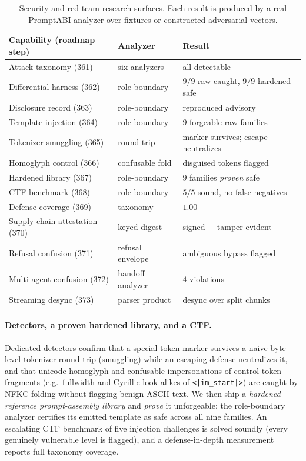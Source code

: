 \documentclass[10pt]{article}
\begin{document}
\begin{table}[t]
\centering
\small
\begin{tabular}{lll}
\toprule
Capability (roadmap step) & Analyzer & Result \\
\midrule
Attack taxonomy (361) & six analyzers & all detectable \\
Differential harness (362) & role-boundary & $9/9$ raw caught, $9/9$ hardened safe \\
Disclosure record (363) & role-boundary & reproduced advisory \\
Template injection (364) & role-boundary & $9$ forgeable raw families \\
Tokenizer smuggling (365) & round-trip & marker survives; escape neutralizes \\
Homoglyph control (366) & confusable fold & disguised tokens flagged \\
Hardened library (367) & role-boundary & $9$ families \emph{proven} safe \\
CTF benchmark (368) & role-boundary & $5/5$ sound, no false negatives \\
Defense coverage (369) & taxonomy & $1.00$ \\
Supply-chain attestation (370) & keyed digest & signed + tamper-evident \\
Refusal confusion (371) & refusal envelope & ambiguous bypass flagged \\
Multi-agent confusion (372) & handoff analyzer & $4$ violations \\
Streaming desync (373) & parser product & desync over split chunks \\
\bottomrule
\end{tabular}
\caption{Security and red-team research surfaces. Each result is produced by a
real PromptABI analyzer over fixtures or constructed adversarial vectors.}
\label{tab:redteam}
\end{table}

\paragraph{Detectors, a proven hardened library, and a CTF.}
Dedicated detectors confirm that a special-token marker survives a naive
byte-level tokenizer round trip (smuggling) while an escaping defense neutralizes
it, and that unicode-homoglyph and confusable impersonations of control-token
fragments (e.g.\ fullwidth and Cyrillic look-alikes of \texttt{<|im\_start|>})
are caught by NFKC-folding without flagging benign ASCII text. We then ship a
\emph{hardened reference prompt-assembly library} and \emph{prove} it
unforgeable: the role-boundary analyzer certifies its emitted template as safe
across all nine families. An escalating CTF benchmark of five injection
challenges is solved soundly (every genuinely vulnerable level is flagged), and a
defense-in-depth measurement reports full taxonomy coverage.
\end{document}
